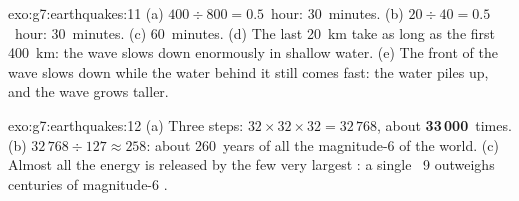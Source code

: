 \begin{solution}{exo:g7:earthquakes:11}
(a) $400 \div 800 = 0.5$~hour: 30~minutes. (b) $20 \div 40 = 0.5$~hour:
30~minutes. (c) 60~minutes. (d) The last \qty{20}{km} take as long as the
first \qty{400}{km}: the wave slows down enormously in shallow water. (e)
The front of the wave slows down while the water behind it still comes
fast: the water piles up, and the wave grows taller.
\end{solution}

\begin{solution}{exo:g7:earthquakes:12}
(a) Three steps: $32 \times 32 \times 32 = 32\,768$, about
\textbf{33\,000}~times. (b) $32\,768 \div 127 \approx 258$: about
260~years of all the magnitude-6  of the world. (c) Almost all
the energy is released by the few very largest : a single
~9 outweighs centuries of magnitude-6 .
\end{solution}

